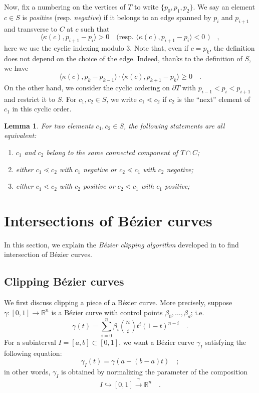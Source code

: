 \documentclass[pdftex,a4paper,12pt]{scrartcl}
\theoremstyle{plain}
\newtheorem{lemma}[theorem]{Lemma}
\theoremstyle{definition}
\theoremstyle{remark}
\numberwithin{equation}{section}
\begin{document}
Now, fix a numbering on the vertices of $T$ to write $\{p_0,p_1,p_2\}$.
We say an element $c\in S$ is \emph{positive} (resp. \emph{negative}) if it belongs to an edge spanned by $p_i$ and $p_{i+1}$ and transverse to $C$ at $c$ such that
\[
\langle\kappa(c),p_{i+1}-p_i\rangle > 0
\quad\text{(resp. } \langle\kappa(c),p_{i+1}-p_i\rangle < 0\text{ )}
\quad,
\]
here we use the cyclic indexing modulo $3$.
Note that, even if $c=p_k$, the definition does not depend on the choice of the edge.
Indeed, thanks to the definition of $S$, we have
\[
\langle\kappa(c),p_k-p_{k-1}\rangle\cdot\langle\kappa(c),p_{k+1}-p_k\rangle\ge 0
\quad.
\]
On the other hand, we consider the cyclic ordering on $\partial T$ with $p_{i-1}<p_i<p_{i+1}$ and restrict it to $S$.
For $c_1,c_2\in S$, we write $c_1\lessdot c_2$ if $c_2$ is the ``next'' element of $c_1$ in this cyclic order.

\begin{lemma}
For two elements $c_1,c_2\in S$, the following statements are all equivalent:
\begin{enumerate}[label=\upshape(\alph*)]
  \item $c_1$ and $c_2$ belong to the same connected component of $T\cap C$;
  \item either $c_1\lessdot c_2$ with $c_1$ negative or $c_2\lessdot c_1$ with $c_2$ negative;
  \item either $c_1\lessdot c_2$ with $c_2$ positive or $c_2\lessdot c_1$ with $c_1$ positive;
\end{enumerate}
\end{lemma}


\section{Intersections of B\'ezier curves}

In this section, we explain the \emph{B\'ezier clipping algorithm} developed in \cite{NishitaTakitaNakamae1992} to find intersection of B\'ezier curves.

\subsection{Clipping B\'ezier curves}

We first discuss clipping a piece of a B\'ezier curve.
More precisely, suppose $\gamma:[0,1]\to\mathbb R^n$ is a B\'ezier curve with control points $\beta_0,\dots,\beta_d$; i.e.
\[
\gamma(t)
= \sum_{i=0}^n \beta_i\binom{n}{i}t^i(1-t)^{n-i}
\quad.
\]
For a subinterval $I=[a,b]\subset[0,1]$, we want a B\'ezier curve $\gamma_I$ satisfying the following equation:
\[
\gamma_I(t) = \gamma(a+(b-a)t)
\quad;
\]
in other words, $\gamma_I$ is obtained by normalizing the parameter of the composition
\[
I\hookrightarrow[0,1]\xrightarrow{\gamma}\mathbb R^n
\quad.
\]
\end{document}
